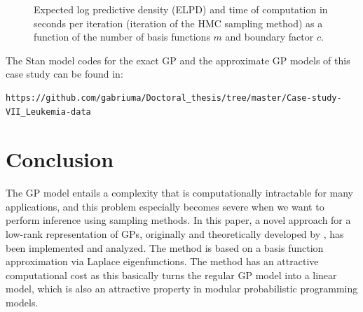 \documentclass[onecolumn,a4paper,11pt]{article}
\begin{document}
\begin{figure}
\caption{Expected log predictive density (ELPD) and time of computation in seconds per iteration (iteration of the HMC sampling method) as a function of the number of basis functions $m$ and boundary factor $c$.}
  \label{ch5_fig22_elpd_leukemia}
\end{figure}

The Stan model codes for the exact GP and the approximate GP models of this case study can be found in:
%
\begin{lstlisting}[breaklines]
https://github.com/gabriuma/Doctoral_thesis/tree/master/Case-study-VII_Leukemia-data
\end{lstlisting}

\section{Conclusion}\label{ch5_sec_conclusion}
The GP model entails a complexity that is computationally intractable for many applications, and this problem especially becomes severe when we want to perform inference using sampling methods. In this paper, a novel approach for a low-rank representation of GPs, originally and theoretically developed by \cite{solin2018hilbert}, has been implemented and analyzed. The method is based on a basis function approximation via Laplace eigenfunctions. The method has an attractive computational cost as this basically turns the regular GP model into a linear model, which is also an attractive property in modular probabilistic programming models. 
\end{document}
